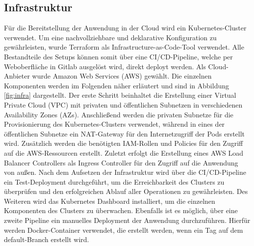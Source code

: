 \documentclass[a4paper, 10pt, conference]{IEEEtran}
\begin{document}
\subsection{Infrastruktur}\label{subsec:infrastruktur}

Für die Bereitstellung der Anwendung in der Cloud wird ein Kubernetes-Cluster \cite{k8s} verwendet. 
Um eine nachvollziehbare und deklarative Konfiguration zu gewährleisten, wurde Terraform \cite{terraform} als Infrastructure-as-Code-Tool verwendet. 
Alle Bestandteile des Setups können somit über eine CI/CD-Pipeline, welche per Weboberfläche in Gitlab ausgelöst wird, direkt deployt werden.
Als Cloud-Anbieter wurde Amazon Web Services (AWS) \cite{aws} gewählt. Die einzelnen Komponenten werden im Folgenden näher erläutert und sind in Abbildung \ref{fig:infra} dargestellt.
Der erste Schritt beinhaltet die Erstellung einer Virtual Private Cloud (VPC) mit privaten und öffentlichen Subnetzen in verschiedenen Availability Zones (AZs).
Anschließend werden die privaten Subnetze für die Provisionierung des Kubernetes-Clusters verwendet, während in eines der öffentlichen Subnetze ein NAT-Gateway für den Internetzugriff der Pods erstellt wird.
Zusätzlich werden die benötigten IAM-Rollen und Policies für den Zugriff auf die AWS-Ressourcen erstellt.
Zuletzt erfolgt die Erstellung eines AWS Load Balancer Controllers als Ingress Controller für den Zugriff auf die Anwendung von außen.
Nach dem Aufsetzen der Infrastruktur wird über die CI/CD-Pipeline ein Test-Deployment durchgeführt, um die Erreichbarkeit des Clusters zu überprüfen und den erfolgreichen Ablauf aller Operationen zu gewährleisten.
Des Weiteren wird das Kubernetes Dashboard installiert, um die einzelnen Komponenten des Clusters zu überwachen.
Ebenfalls ist es möglich, über eine zweite Pipeline ein manuelles Deployment der Anwendung durchzuführen.
Hierfür werden Docker-Container verwendet, die erstellt werden, wenn ein Tag auf dem default-Branch erstellt wird.
\end{document}
